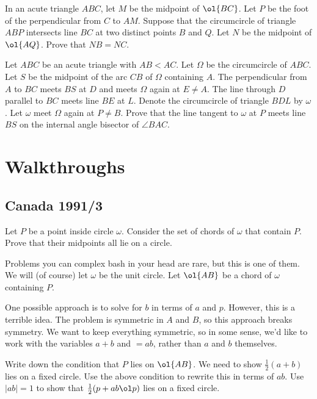 \documentclass[11pt]{scrartcl}
\begin{document}
\begin{problem}[USAMO 2023/1]
	In an acute triangle $ABC$, let $M$ be the midpoint of $\ol{BC}$. Let $P$ be the foot of the perpendicular from $C$ to $AM$. Suppose that the circumcircle of triangle $ABP$ intersects line $BC$ at two distinct points $B$ and $Q$. Let $N$ be the midpoint of $\ol{AQ}$. Prove that $NB=NC$.
\end{problem}

\begin{problem}[IMO 2023/2]
	Let $ABC$ be an acute triangle with $AB < AC$. Let $\Omega$ be the circumcircle of $ABC$. Let $S$ be the midpoint of the arc $CB$ of $\Omega$ containing $A$. The perpendicular from $A$ to $BC$ meets $BS$ at $D$ and meets $\Omega$ again at $E \neq A$. The line through $D$ parallel to $BC$ meets line $BE$ at $L$. Denote the circumcircle of triangle $BDL$ by $\omega$. Let $\omega$ meet $\Omega$ again at $P \neq B$. Prove that the line tangent to $\omega$ at $P$ meets line $BS$ on the internal angle bisector of $\angle BAC$.
\end{problem}

\pagebreak

\section{Walkthroughs}
\label{sec:walkthroughs}

\subsection{Canada 1991/3}

\begin{example}[Canada 1991/3]
	Let $P$ be a point inside circle $\omega$. Consider the set of chords of $\omega$ that contain $P$. Prove that their midpoints all lie on a circle.
\end{example}

\begin{walkthrough}
	Problems you can complex bash in your head are rare, but this is one of them. We will (of course) let $\omega$ be the unit circle. Let $\ol{AB}$ be a chord of $\omega$ containing $P$.

	One possible approach is to solve for $b$ in terms of $a$ and $p$. However, this is a terrible idea. The problem is symmetric in $A$ and $B$, so this approach breaks symmetry. We want to keep everything symmetric, so in some sense, we'd like to work with the variables $a + b$ and $= ab$, rather than $a$ and $b$ themselves.
	\begin{walk}
		\ii Write down the condition that $P$ lies on $\ol{AB}$.
		\ii We need to show $\frac12(a + b)$ lies on a fixed circle. Use the above condition to rewrite this in terms of $ab$.
		\ii Use $\lvert ab\rvert = 1$ to show that $\frac12(p + ab\ol p)$ lies on a fixed circle.
	\end{walk}
\end{walkthrough}
\end{document}
